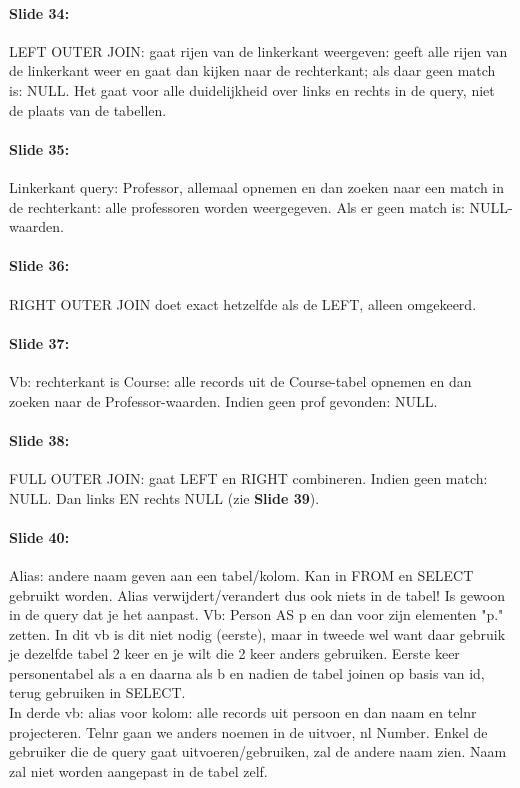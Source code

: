 \documentclass[10pt,a4paper]{report}
\begin{document}
\paragraph{Slide 34:}LEFT OUTER JOIN: gaat rijen van de linkerkant weergeven: geeft alle rijen van de linkerkant weer en gaat dan kijken naar de rechterkant; als daar geen match is: NULL. Het gaat voor alle duidelijkheid over links en rechts in de query, niet de plaats van de tabellen.

\paragraph{Slide 35:}Linkerkant query: Professor, allemaal opnemen en dan zoeken naar een match in de rechterkant: alle professoren worden weergegeven. Als er geen match is: NULL-waarden.

\paragraph{Slide 36:}RIGHT OUTER JOIN doet exact hetzelfde als de LEFT, alleen omgekeerd.

\paragraph{Slide 37:}Vb: rechterkant is Course: alle records uit de Course-tabel opnemen en dan zoeken naar de Professor-waarden. Indien geen prof gevonden: NULL.

\paragraph{Slide 38:}FULL OUTER JOIN: gaat LEFT en RIGHT combineren. Indien geen match: NULL. Dan links EN rechts NULL (zie \textbf{Slide 39}).

\paragraph{Slide 40:}Alias: andere naam geven aan een tabel/kolom. Kan in FROM en SELECT gebruikt worden. Alias verwijdert/verandert dus ook niets in de tabel! Is gewoon in de query dat je het aanpast. Vb: Person AS p en dan voor zijn elementen "p." zetten. In dit vb is dit niet nodig (eerste), maar in tweede wel want daar gebruik je dezelfde tabel 2 keer en je wilt die 2 keer anders gebruiken. Eerste keer personentabel als a en daarna als b en nadien de tabel joinen op basis van id, terug gebruiken in SELECT.\\
In derde vb: alias voor kolom: alle records uit persoon en dan naam en telnr projecteren. Telnr gaan we anders noemen in de uitvoer, nl Number. Enkel de gebruiker die de query gaat uitvoeren/gebruiken, zal de andere naam zien. Naam zal niet worden aangepast in de tabel zelf.
\end{document}
